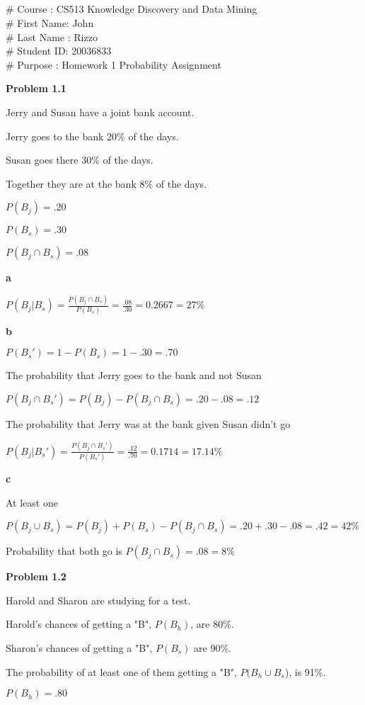 \documentclass[12pt, letterpaper]{article}
\title{\classname \\ \assignmentdescription}
\author{\firstname\lastname}
\newcommand{\course}    {CS513 Knowledge Discovery and Data Mining}
\newcommand{\firstname} {John}
\newcommand{\lastname}  {Rizzo}
\newcommand{\studentid} {20036833}
\newcommand{\purpose}   {Homework 1 Probability Assignment}
\begin{document}
\noindent
\# Course    : \course \\
\# First Name: \firstname \\
\# Last Name : \lastname \\
\# Student ID: \studentid \\
\# Purpose   : \purpose

\hfill

\noindent
\textbf{Problem 1.1}

Jerry and Susan have a joint bank account.

Jerry goes to the bank 20\% of the days.

Susan goes there 30\% of the days.

Together they are at the bank 8\% of the days.

$P(B_j) = .20$

$P(B_s) = .30$

$P(B_j \cap B_s) = .08$

\textbf{a}

$P(B_j|B_s) = \frac{P(B_j \cap B_s)}{P(B_s)} = \frac{.08}{.30} = 0.2667 = 27\%$

\textbf{b}

$P(B_s') = 1 - P(B_s) = 1 - .30 = .70$

The probability that Jerry goes to the bank and not Susan

$P(B_j \cap B_s') = P(B_j) - P(B_j \cap B_s) = .20 - .08 = .12$

The probability that Jerry was at the bank given Susan didn't go

$P(B_j|B_s') = \frac{P(B_j \cap B_s')}{P(B_s')} = \frac{.12}{.70} = 0.1714 = 17.14\%$

\textbf{c}

At least one 

$P(B_j \cup B_s) = P(B_j) + P(B_s) - P(B_j \cap B_s) = .20 + .30 - .08 = .42 = 42\%$

Probability that both go is $P(B_j \cap B_s) = .08 = 8\%$

\hfill

\noindent
\textbf{Problem 1.2}

Harold and Sharon are studying for a test.

Harold's chances of getting a "B", $P(B_h)$, are 80\%.

Sharon's chances of getting a "B", $P(B_s)$ are 90\%.

The probability of at least one of them getting a "B", $P(B_h \cup B_s$), is 91\%.

$P(B_h) = .80$
\end{document}
